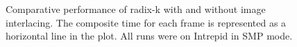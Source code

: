\documentclass{sig-alternate}
\begin{document}
\begin{figure}[htbp]
  \centering
  \hfill
  \caption{Comparative performance of radix-k with and without image
    interlacing.  The composite time for each frame is represented as a
    horizontal line in the plot.  All runs were on Intrepid in SMP mode.}
  \label{fig:InterlacePerformance}
\end{figure}
\end{document}
